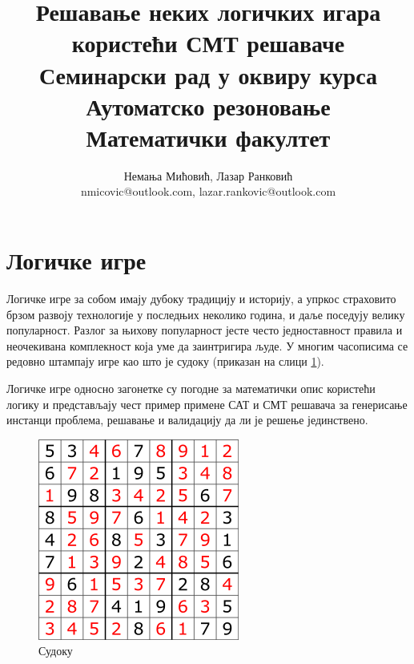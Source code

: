 \documentclass[a4paper]{article}
\begin{document}
\title{Решавање неких логичких игара користећи СМТ решаваче\\ \small{Семинарски рад у оквиру курса\\Аутоматско резоновање\\ Математички факултет}}

\author{Немања Мићовић, Лазар Ранковић\\nmicovic@outlook.com, lazar.rankovic@outlook.com}
\date{}
\maketitle


\tableofcontents

\newpage

\section{Логичке игре}
Логичке игре за собом имају дубоку традицију и историју, а упркос страховито брзом развоју технологије у последњих
неколико година, и даље поседују велику популарност. Разлог за њихову популарност јесте често једноставност правила
и неочекивана комплекност која уме да заинтригира људе. У многим часописима се редовно штампају игре као што је судоку
(приказан на слици \ref{fig:sudoku}).

Логичке игре односно загонетке су погодне за математички опис користећи логику и представљају чест пример примене
САТ и СМТ решавача за генерисање инстанци проблема, решавање и валидацију да ли је решење јединствено.

\begin{figure}[h!]
    \begin{center}
        \includegraphics[scale=0.4]{./slike/sudoku.png}
    \end{center}
    \caption{Судоку}
    \label{fig:sudoku}
\end{figure}
\end{document}
